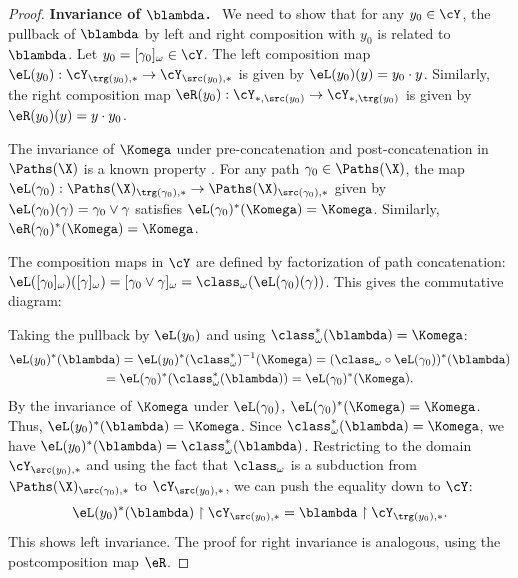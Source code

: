 \begin{proof}
    \textbf{Invariance of $\blambda$.}~
    We need to show that for any $y_0 \in \cY$,
    the pullback of $\blambda$ by left and right composition with $y_0$ is related to $\blambda$.
    Let $y_0 = [\gamma_0]_\omega \in \cY$.
    The left composition map $\eL(y_0) : \cY_{\trg(y_0), \ast} \to \cY_{\src(y_0), \ast}$ is given by $\eL(y_0)(y) = y_0 \cdot y$.
    Similarly,
    the right composition map $\eR(y_0) : \cY_{\ast, \src(y_0)} \to \cY_{\ast, \trg(y_0)}$ is given by $\eR(y_0)(y) = y \cdot y_0$.
    
    The invariance of $\Komega$ under pre-concatenation and post-concatenation in $\Paths(\X)$ is a known property \cite[]{PIZ13}.
    For any path $\gamma_0 \in \Paths(\X)$,
    the map $\eL(\gamma_0) : \Paths(\X)_{\trg(\gamma_0), \ast} \to \Paths(\X)_{\src(\gamma_0), \ast}$ given by $\eL(\gamma_0)(\gamma) = \gamma_0 \vee \gamma$ satisfies $\eL(\gamma_0)^*(\Komega) = \Komega$.
    Similarly, $\eR(\gamma_0)^*(\Komega) = \Komega$.
    
    The composition maps in $\cY$ are defined by factorization of path concatenation: $\eL([\gamma_0]_\omega)([\gamma]_\omega) = [\gamma_0 \vee \gamma]_\omega = \class_\omega(\eL(\gamma_0)(\gamma))$.
    This gives the commutative diagram:
    \begin{center}
    \end{center}
    Taking the pullback by $\eL(y_0)$ and using $\class_\omega^*(\blambda) = \Komega$:
    \begin{multline*}
      \eL(y_0)^*(\blambda) = \eL(y_0)^*(\class_\omega^*)^{-1}(\Komega) = (\class_\omega \circ \eL(\gamma_0))^*(\blambda) \\
      = \eL(\gamma_0)^*(\class_\omega^*(\blambda)) = \eL(\gamma_0)^*(\Komega).
    \end{multline*}
    By the invariance of $\Komega$ under $\eL(\gamma_0)$, $\eL(\gamma_0)^*(\Komega) = \Komega$.
    Thus,
    $\eL(y_0)^*(\blambda) = \Komega$.
    Since $\class_\omega^*(\blambda) = \Komega$,
    we have $\eL(y_0)^*(\blambda) = \class_\omega^*(\blambda)$.
    Restricting to the domain $\cY_{\src(y_0), \ast}$ and using the fact that $\class_\omega$ is a subduction from $\Paths(\X)_{\src(\gamma_0), \ast}$ to $\cY_{\src(y_0), \ast}$,
    we can push the equality down to $\cY$:
    $$
      \eL(y_0)^*(\blambda) \restriction {\cY_{\src(y_0), \ast}} = \blambda \restriction {\cY_{\trg(y_0), \ast}}.
      $$
    This shows left invariance.
    The proof for right invariance is analogous,
    using the postcomposition map $\eR$.
    

\end{proof}
